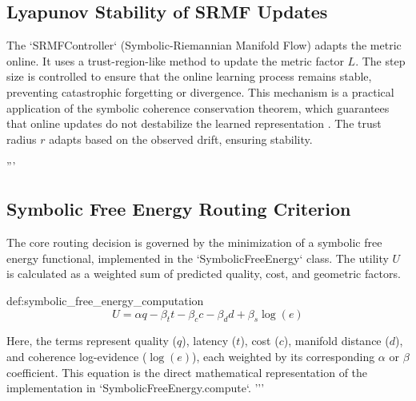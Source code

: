 \documentclass[11pt]{article}
\begin{document}
\subsection{Lyapunov Stability of SRMF Updates}
\label{theorem:bk2_srmf_update_stability}
The `SRMFController` (Symbolic-Riemannian Manifold Flow) adapts the metric online. It uses a trust-region-like method to update the metric factor $L$. The step size is controlled to ensure that the online learning process remains stable, preventing catastrophic forgetting or divergence. This mechanism is a practical application of the symbolic coherence conservation theorem, which guarantees that online updates do not destabilize the learned representation \cite{principia_symbolica}. The trust radius $r$ adapts based on the observed drift, ensuring stability.

'''
\subsection{Symbolic Free Energy Routing Criterion}
\label{def:symbolic_free_energy_computation}
The core routing decision is governed by the minimization of a symbolic free energy functional, implemented in the `SymbolicFreeEnergy` class. The utility $U$ is calculated as a weighted sum of predicted quality, cost, and geometric factors.
\begin{bridgeblock}{def:symbolic_free_energy_computation}
\begin{equation}
U = \alpha q - \beta_t t - \beta_c c - \beta_d d + \beta_s \log(e)
\end{equation}
\end{bridgeblock}
Here, the terms represent quality ($q$), latency ($t$), cost ($c$), manifold distance ($d$), and coherence log-evidence ($\log(e)$), each weighted by its corresponding $\alpha$ or $\beta$ coefficient. This equation is the direct mathematical representation of the implementation in `SymbolicFreeEnergy.compute`.
'''
\end{document}
